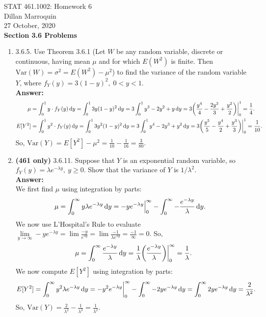 \documentclass{article}
\begin{document}
    \noindent STAT 461.1002: Homework 6\\
    Dillan Marroquin\\
    27 October, 2020\\

    \noindent \textbf{Section 3.6 Problems}
    \begin{enumerate}
        \item 3.6.5. Use Theorem 3.6.1 (Let $W$ be any random variable, discrete or continuous, having mean $\mu$ and for which $E(W^2)$ is finite. Then $\mathrm{Var}(W) = \sigma^2 = E(W^2)-\mu^2$) to find the variance of the random variable $Y$, where $f_Y(y) = 3(1-y)^2, \; 0 < y < 1$.\\
        \textbf{Answer: }
        \begin{align*}
            \mu &= \int_0^1 y \cdot f_Y(y) \dif y = \int_0^1 3y(1-y)^2 \dif y = 3\int_0^1 y^3-2y^2+y \dif y = 3\bigg(\frac{y^4}{4}-\frac{2y^3}{3}+\frac{y^2}{2}\bigg)\bigg|_0^1 = \frac{1}{4}.\\
            E[Y^2] &= \int_0^1 y^2 \cdot f_Y(y) \dif y = \int_0^1 3y^2(1-y)^2 \dif y = 3\int_0^1 y^4-2y^3+y^2 \dif y = 3\bigg(\frac{y^5}{5}-\frac{y^4}{2}+\frac{y^3}{3}\bigg)\bigg|_0^1 = \frac{1}{10}.
        \end{align*}
        So, $\mathrm{Var}(Y) = E[Y^2]-\mu^2 = \frac{1}{10}-\frac{1}{16} = \frac{3}{80}$.\\
        
        \item \textbf{(461 only)} 3.6.11. Suppose that $Y$ is an exponential random variable, so $f_Y(y) = \lambda e^{-\lambda y}, \ y \geq 0$. Show that the variance of $Y$ is $1/\lambda^2$.\\
        \textbf{Answer: }\\
        We first find $\mu$ using integration by parts:
        \begin{align*}
            \mu &= \int_0^\infty y\lambda e^{-\lambda y} \dif y = -ye^{-\lambda y}\Big|_0^\infty - \int_0^\infty -\frac{e^{-\lambda y}}{\lambda} \dif y.
        \end{align*}
        We now use L'Hospital's Rule to evaluate $\lim\limits_{y \to \infty} -ye^{-\lambda y} = \lim \frac{-y}{e^{\lambda y}} = \lim \frac{-1}{\lambda e^{\lambda y}} = \frac{-1}{\infty} = 0$. So,
        \begin{align*}
           \mu = \int_0^\infty \frac{e^{-\lambda y}}{\lambda} \dif y = \frac{1}{\lambda} \bigg(\frac{e^{-\lambda y}}{\lambda}\bigg)\bigg|_0^\infty = \frac{1}{\lambda}.
         \end{align*}
         We now compute $E[Y^2]$ using integration by parts:
         \begin{align*}
            E[Y^2] &= \int_0^\infty y^2\lambda e^{-\lambda y} \dif y = -y^2e^{-\lambda y}\bigg|_0^\infty - \int_0^\infty -2ye^{-\lambda y} \dif y = \int_0^\infty 2ye^{-\lambda y} \dif y = \frac{2}{\lambda^2}.
        \end{align*}
        So, $\mathrm{Var}(Y) = \frac{2}{\lambda^2}-\frac{1}{\lambda^2} = \frac{1}{\lambda^2}$.\\
        

\end{enumerate}
\end{document}
